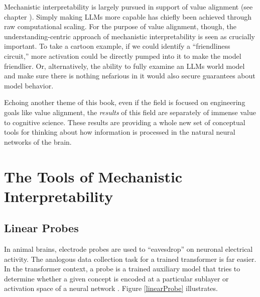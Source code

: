 
Mechanistic interpretability is largely pursued in support of value alignment
(see chapter ). Simply making LLMs more capable has
chiefly been achieved through raw computational scaling. For the purpose of
value alignment, though, the understanding-centric approach of mechanistic
interpretability is seen as crucially important. To take a cartoon example, if
we could identify a ``friendliness circuit,'' more activation could be directly
pumped into it to make the model friendlier. Or, alternatively, the ability to
fully examine an LLMs world model and make sure there is nothing nefarious in
it would also secure guarantees about model behavior.

Echoing another theme of this book, even if the field is focused on engineering
goals like value alignment, the \emph{results} of this field are separately of
immense value to cognitive science. These results are providing a whole new set
of conceptual tools for thinking about how information is processed in the
natural neural networks of the brain.

\section{The Tools of Mechanistic Interpretability}

\subsection{Linear Probes}

In animal brains, electrode probes are used to ``eavesdrop'' on neuronal
electrical activity. The analogous data collection task for a trained
transformer is far easier. In the transformer context, a probe is a trained
auxiliary model that tries to determine whether a given concept is encoded at a
particular sublayer or activation space of a neural
network \cite{alain2018intermediate, belinkov2021classifiers}. Figure
\ref{linearProbe} illustrates.

